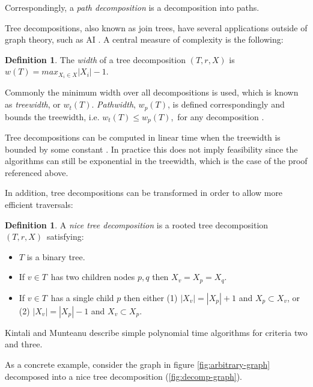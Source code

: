 \documentclass[a4paper,11pt]{report}
\theoremstyle{plain}
\theoremstyle{definition}
\newtheorem{defn}[thm]{Definition} %
\begin{document}
Correspondingly, a \emph{path decomposition} is a decomposition into paths.

Tree decompositions, also known as join trees, have several applications outside of graph theory, such as AI \cite{carr00}.
A central measure of complexity is the following:

\begin{defn}
The \emph{width} of a tree decomposition $(T, r, X)$ is $w(T) = max_{X_i \in X} |X_i| - 1$.
\end{defn}
Commonly the minimum width over all decompositions is used, which is known as \emph{treewidth}, or $w_t(T)$.
\emph{Pathwidth}, $w_p(T)$, is defined correspondingly and bounds the treewidth, i.e. $w_t(T) \leq w_p(T)$, for any decomposition \cite{kintali12}.

Tree decompositions can be computed in linear time when the treewidth is bounded by some constant \cite{bodlaender96}.
In practice this does not imply feasibility since the algorithms can still be exponential in the treewidth, which is the case of the proof referenced above.

In addition, tree decompositions can be transformed in order to allow more efficient traversals:

\begin{defn}
A \emph{nice tree decomposition} is a rooted tree decomposition $(T, r, X)$ satisfying:
\begin{itemize}
\item $T$ is a binary tree.
\item If $v \in T$ has two children nodes $p, q$ then $X_v = X_p = X_q$.
\item If $v \in T$ has a single child $p$ then either
  (1) $|X_v| = |X_p| + 1$ and $X_p \subset X_v$, or (2) $|X_v| = |X_p| - 1$ and $X_v \subset X_p$.
\end{itemize}
\end{defn}

Kintali and Munteanu \cite{kintali12} describe simple polynomial time algorithms for criteria two and three.

As a concrete example, consider the graph in figure \ref{fig:arbitrary-graph} decomposed into a nice tree decomposition (\ref{fig:decomp-graph}).
\end{document}
